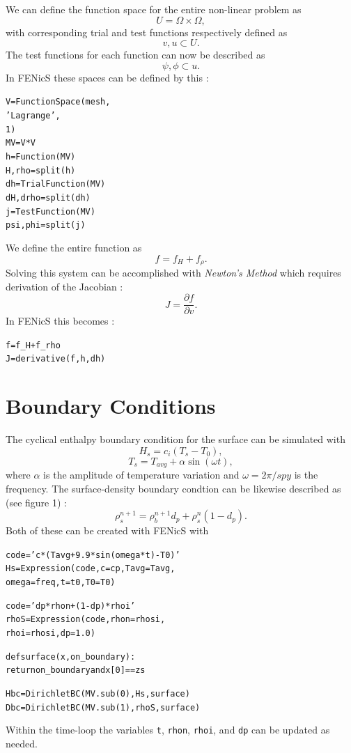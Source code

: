 \documentclass{article}%
\begin{document}
We can define the function space for the entire non-linear problem as 
  $$
    U = \Omega \times \Omega,
  $$
with corresponding trial and test functions respectively defined as
  $$
    v, u \subset U.
  $$
The test functions for each function can now be described as
  $$
    \psi, \phi \subset u.
  $$
In FENicS these spaces can be defined by this :
\small
\begin{alltt}
V         = FunctionSpace(mesh, 
                          'Lagrange', 
                          1)
MV        = V*V
h         = Function(MV)
H,rho     = split(h)    
dh        = TrialFunction(MV)
dH, drho  = split(dh)
j         = TestFunction(MV)
psi, phi  = split(j)
\end{alltt}
\normalsize

We define the entire function as 
  $$
    f = f_H + f_{\rho}.
  $$
Solving this system can be accomplished with \emph{Newton's Method} which requires derivation of the Jacobian :
  $$
    J = \frac{\partial f}{\partial v}.
  $$
In FENicS this becomes :
\small
\begin{alltt}
f  = f_H + f_rho
J  = derivative(f, h, dh)
\end{alltt}
\normalsize


\section{Boundary Conditions}

The cyclical enthalpy boundary condition for the surface can be simulated with 
  $$
    H_s = c_i ( T_s - T_0 ),
  $$
  $$
    T_s = T_{avg} + \alpha \sin(\omega t),
  $$
where $\alpha$ is the amplitude of temperature variation and $\omega = 2\pi / spy$ is the frequency.  The surface-density boundary condtion can be likewise described as (see figure 1) : 
  $$
    \rho_s^{n+1} = \rho_b^{n+1} d_p + \rho_s^{n} (1 - d_p).
  $$
Both of these can be created with FENicS with
\small
\begin{alltt}
code = 'c*(Tavg + 9.9*sin(omega*t) - T0)'
Hs   = Expression(code, c=cp, Tavg=Tavg, 
                  omega=freq, t=t0, T0=T0)

code = 'dp*rhon + (1 - dp)*rhoi'
rhoS = Expression(code, rhon=rhosi, 
                  rhoi=rhosi, dp=1.0)

def surface(x, on_boundary):
  return on_boundary and x[0] == zs

Hbc  = DirichletBC(MV.sub(0), Hs, surface)
Dbc  = DirichletBC(MV.sub(1), rhoS, surface)
\end{alltt}
\normalsize
Within the time-loop the variables \texttt{t}, \texttt{rhon}, \texttt{rhoi}, and \texttt{dp} can be updated as needed.
\end{document}
